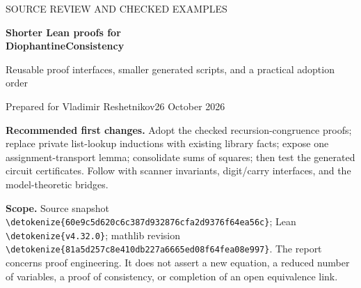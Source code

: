 \documentclass[11pt,letterpaper]{article}
\newcommand{\code}[1]{\expandafter\nolinkurl\expandafter{\detokenize{#1}}}
\begin{document}
\thispagestyle{empty}
{\Large\sffamily\color{accent} SOURCE REVIEW AND CHECKED EXAMPLES}\par
\vspace{12pt}
{\huge\bfseries\color{ink} Shorter Lean proofs for\\DiophantineConsistency}\par
\vspace{9pt}
{\large Reusable proof interfaces, smaller generated scripts, and a practical adoption order}\par
\vspace{12pt}
Prepared for Vladimir Reshetnikov\hfill 26 October 2026

\begin{abstract}
The largest opportunity in this development is to centralize recurring proof arguments while keeping the arithmetic data and public theorem statements stable. The repository already contains strong abstractions: topological circuit semantics, a power certificate, structural degree bounds, assignment renaming, and a semantic window interface. Several clients still repeat the arguments that these interfaces can discharge.

This report identifies concrete sites in the pinned source, supplies independently checkable Lean examples and reviewable patches, and separates completed compilation checks from source-level proposals. A generated-circuit candidate reduces two files from 6,567 to 4,917 physical lines, including its new helper and certificate data, while preserving 1,192 public theorem signatures. That is a measured source reduction, not a claim of a faster build or a completed integration. Smaller primitive-recursion replacements have been checked in complete modified files.
\end{abstract}

\textbf{Recommended first changes.} Adopt the checked recursion-congruence proofs; replace private list-lookup inductions with existing library facts; expose one assignment-transport lemma; consolidate sums of squares; then test the generated circuit certificates. Follow with scanner invariants, digit/carry interfaces, and the model-theoretic bridges.

\textbf{Scope.} Source snapshot \code{60e9c5d620c6c387d932876cfa2d9376f64ea56c}; Lean \code{v4.32.0}; mathlib revision \code{81a5d257c8e410db227a6665ed08f64fea08e997}. The report concerns proof engineering. It does not assert a new equation, a reduced number of variables, a proof of consistency, or completion of an open equivalence link.
\end{document}
